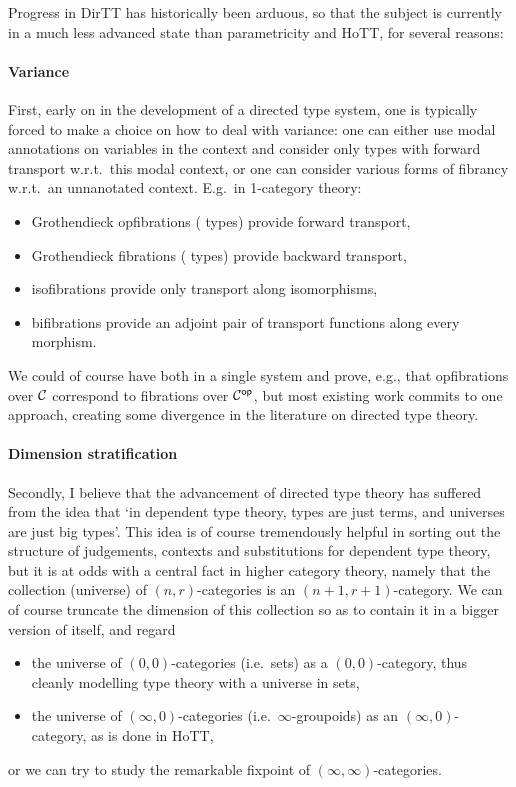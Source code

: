 \documentclass[twoLevelNum]{higherStructures} %
\begin{document}
Progress in DirTT has historically been arduous, so that the subject is currently in a much less advanced state than parametricity and HoTT, for several reasons:

\paragraph{Variance}
First, early on in the development of a directed type system, one is typically forced to make a choice on how to deal with variance: one can either use modal annotations on variables in the context and consider only \covarfib{} types with forward transport w.r.t.\ this modal context, or one can consider various forms of fibrancy w.r.t.\ an unnanotated context.
E.g.\ in 1-category theory:
\begin{itemize}
	\item Grothendieck opfibrations (\covarfib{} types) provide forward transport,
	\item Grothendieck fibrations (\contravarfib{} types) provide backward transport,
	\item isofibrations provide only transport along isomorphisms,
	\item bifibrations provide an adjoint pair of transport functions along every morphism.
\end{itemize}
We could of course have both in a single system and prove, e.g., that opfibrations over ${\mathcal{C}}$ correspond to fibrations over ${\mathcal{C}}^{\mathsf{op}}$,
but most existing work commits to one approach, creating some divergence in the literature on directed type theory.

\paragraph{Dimension stratification}
Secondly, I believe that the advancement of directed type theory has suffered from the idea that `in dependent type theory, types are just terms, and universes are just big types'.
This idea is of course tremendously helpful in sorting out the structure of judgements, contexts and substitutions for dependent type theory, but it is at odds with a central fact in higher category theory, namely that the collection (universe) of $(n, r)$-categories is an $(n+1, r+1)$-category.
We can of course truncate the dimension of this collection so as to contain it in a bigger version of itself, and regard
\begin{itemize}
	\item the universe of $(0, 0)$-categories (i.e.\ sets) as a $(0, 0)$-category, thus cleanly modelling type theory with a universe in sets,
	\item the universe of $(\infty, 0)$-categories (i.e.\ $\infty$-groupoids) as an $(\infty, 0)$-category, as is done in HoTT,
\end{itemize}
or we can try to study the remarkable fixpoint of $(\infty,\infty)$-categories.
\end{document}
